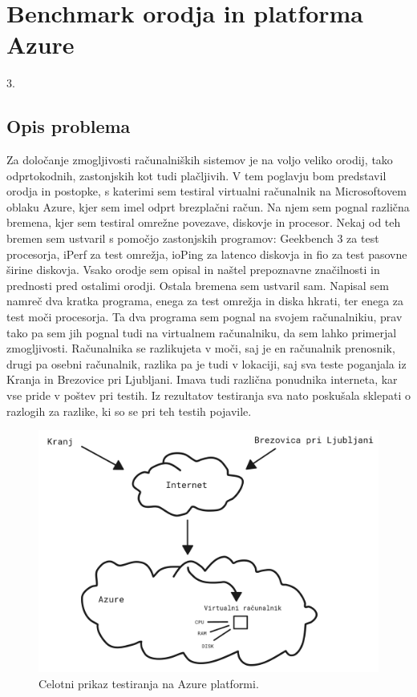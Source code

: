 \chapter{Benchmark orodja in platforma Azure}

\pagestyle{fancy}
\fancyhf{}
\fancyhead[LE,RO]{\thepage}
\fancyhead[RE,LO]{\leftmark}

\huge 3.

\normalsize
\bigskip

\section{Opis problema}
Za določanje zmogljivosti računalniških sistemov je na voljo veliko orodij, tako odprtokodnih, zastonjskih kot tudi plačljivih. V tem poglavju bom predstavil orodja in postopke, s katerimi sem testiral virtualni računalnik na Microsoftovem oblaku Azure, kjer sem imel odprt brezplačni račun. Na njem sem pognal različna bremena, kjer sem testiral omrežne povezave, diskovje in procesor. Nekaj od teh bremen sem ustvaril s pomočjo zastonjskih programov: Geekbench 3 za test procesorja, iPerf za test omrežja, ioPing za latenco diskovja in fio za test pasovne širine diskovja. Vsako orodje sem opisal in naštel prepoznavne značilnosti in prednosti pred ostalimi orodji. Ostala bremena sem ustvaril sam. Napisal sem namreč dva kratka programa, enega za test omrežja in diska hkrati, ter enega za test moči procesorja. Ta dva programa sem pognal na svojem računalnikiu, prav tako pa sem jih pognal tudi na virtualnem računalniku, da sem lahko primerjal zmogljivosti. Računalnika se razlikujeta v moči, saj je en računalnik prenosnik, drugi pa osebni računalnik, razlika pa je tudi v lokaciji, saj sva teste poganjala iz Kranja in Brezovice pri Ljubljani. Imava tudi različna ponudnika interneta, kar vse pride v poštev pri testih. Iz rezultatov testiranja sva nato poskušala sklepati o razlogih za razlike, ki so se pri teh testih pojavile.
  
\begin{figure}[H]
	\centering
	\includegraphics[scale=0.15]{Img/celotni_diagram.png}
	\caption{Celotni prikaz testiranja na Azure platformi.}
	\label{fig:7_breme2}
\end{figure}


